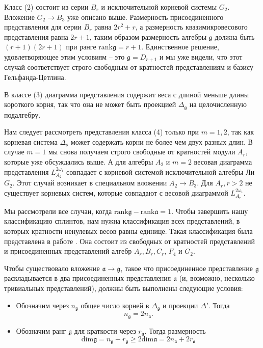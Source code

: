 \documentclass[12pt]{article}
\newcommand{\gf}{\mathfrak{g}}
\newcommand{\af}{\mathfrak{a}}
\newcommand{\sfr}{\mathfrak{s}}
\begin{document}

Класс (2) состоит из серии  $B_{r}$ и исключительной корневой системы $G_{2}$. Вложение  $G_{2}\to
B_{3}$ уже описано выше. Размерность присоединенного представления для серии $B_{r}$ равна
$2r^{2}+r$, а размерность квазимикровесового представления равна $2r+1$, таким образом размерность
алгебры 
$\gf$ должна быть $(r+1)(2r+1)$ при ранге $\mathrm{rank}\gf=r+1$. Единственное решение,
удовлетворяющее этим условиям -- это  $\gf=D_{r+1}$ и мы уже видели, что этот случай соответствует
строго свободным от кратностей представлениям и базису Гельфанда-Цетлина.

В классе  (3) диаграмма представления содержит веса с длиной меньше длины короткого корня, так что
она не может быть проекцией  $\Delta_{\gf}$ на целочисленную подалгебру.

Нам следует рассмотреть представления класса  (4) только при $m=1,2$, так как корневая система
$\Delta_{\sfr}$ может содержать корни не более чем двух разных длин. В случае $m=1$ мы снова
получаем строго свободные от кратностей модули $A_{r}$, которые уже обсуждались выше. А для алгебры
$A_{2}$ и $m=2$ весовая диаграмма представления $L^{2\omega_{1}}_{A_{2}}$ совпадает с корневой
системой исключительной алгебры Ли
$G_{2}$. Этот случай возникает в специальном вложении  $A_{2}\to B_{3}$. Для $A_{r}, r>2$ не
существует корневых систем, которые совпадают с весовой диаграммой $L^{2\omega_{1}}_{A_{r}}$. 

Мы рассмотрели все случаи, когда $\mathrm{rank}\gf-\mathrm{rank}\af=1$. Чтобы завершить нашу
классификацию сплинтов, нам нужна классификация всех представлений, в которых кратности ненулевых
весов равны единице. Такая классификация была представлена в работе
\cite{plotkin1998visual}. Она состоит из свободных от кратностей представлений и присоединенных
представлений алгебр  $A_{r}, B_{r}, C_{r}$, $F_{4}$ и $G_{2}$. 

Чтобы существовало вложение $\af\to \gf$, такое что присоединенное представление  $\gf$
раскладывается в два присоединенных представления $\af$ (и, возможно, несколько тривиальных
представлений), должны быть выполнены следующие условия:
\begin{itemize}
\item Обозначим через $n_{\gf}$ общее число корней в  $\Delta_{\gf}$ и проекции $\Delta'$.
  Тогда
  \begin{equation}
    \label{eq:5}
    n_{\gf}=2n_{\af}.
  \end{equation}
\item Обозначим ранг $\gf$ для краткости через $r_{\gf}$. Тогда размерность
  \begin{equation}
    \label{eq:6}
    \mathrm{dim}\gf=n_{\gf}+r_{\gf}\geq 2\mathrm{dim}\af=2n_{\af}+2r_{\af}
  \end{equation}

\end{itemize}
\end{document}
